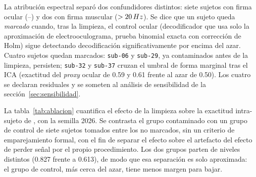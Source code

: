 La atribución espectral separó dos confundidores distintos: siete sujetos con
firma ocular (--) y dos con firma muscular ($>20\,Hz$). Se dice que
un sujeto queda \emph{marcado} cuando, tras la limpieza, el control ocular
(decodificador que usa solo la aproximación de electrooculograma, prueba binomial exacta con
corrección de Holm) sigue detectando decodificación significativamente por encima
del azar. Cuatro sujetos quedan marcados: \texttt{sub-06} y \texttt{sub-29}, ya
contaminados antes de la limpieza, persisten; \texttt{sub-32} y \texttt{sub-37}
cruzan el umbral de forma marginal tras el ICA (exactitud del \textit{proxy} ocular
de 0.59 y 0.61 frente al azar de 0.50). Los cuatro se declaran residuales y se
someten al análisis de sensibilidad de la sección~\ref{sec:sensibilidad}.

La tabla~\ref{tab:ablacion} cuantifica el efecto de la limpieza sobre la
exactitud intra-sujeto de \eegnet{}, con la semilla 2026. Se contrasta el grupo contaminado
con un grupo de control de siete sujetos tomados entre los no marcados, sin un criterio de
emparejamiento formal, con el fin de separar el efecto sobre el artefacto del efecto de
perder señal por el propio procedimiento. Los dos grupos parten de niveles distintos
(0.827 frente a 0.613), de modo que esa separación es solo aproximada: el grupo de control,
más cerca del azar, tiene menos margen para bajar.

